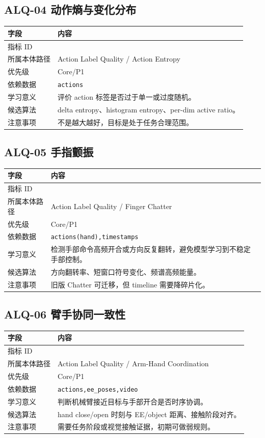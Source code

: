 \documentclass[UTF8,zihao=-4]{ctexart}
\newcommand{\Code}[1]{\texttt{#1}}
\newcommand{\MID}[1]{\texttt{\seqsplit{#1}}}
\begin{document}
\subsection{ALQ-04 动作熵与变化分布}

\begin{longtable}{L{3.6cm} L{9.6cm}}
\toprule
字段 & 内容 \\
\midrule
指标 ID & \MID{ALQ-04} \\
所属本体路径 & Action Label Quality / Action Entropy \\
优先级 & Core/P1 \\
依赖数据 & \Code{actions} \\
学习意义 & 评价 action 标签是否过于单一或过度随机。 \\
候选算法 & delta entropy、histogram entropy、per-dim active ratio。 \\
注意事项 & 不是越大越好，目标是处于任务合理范围。 \\
\bottomrule
\end{longtable}

\subsection{ALQ-05 手指颤振}

\begin{longtable}{L{3.6cm} L{9.6cm}}
\toprule
字段 & 内容 \\
\midrule
指标 ID & \MID{ALQ-05} \\
所属本体路径 & Action Label Quality / Finger Chatter \\
优先级 & Core/P1 \\
依赖数据 & \Code{actions(hand),timestamps} \\
学习意义 & 检测手部命令高频开合或方向反复翻转，避免模型学习到不稳定手部控制。 \\
候选算法 & 方向翻转率、短窗口符号变化、频谱高频能量。 \\
注意事项 & 旧版 Chatter 可迁移，但 timeline 需要降碎片化。 \\
\bottomrule
\end{longtable}

\subsection{ALQ-06 臂手协同一致性}

\begin{longtable}{L{3.6cm} L{9.6cm}}
\toprule
字段 & 内容 \\
\midrule
指标 ID & \MID{ALQ-06} \\
所属本体路径 & Action Label Quality / Arm-Hand Coordination \\
优先级 & Core/P1 \\
依赖数据 & \Code{actions,ee\_poses,video} \\
学习意义 & 判断机械臂接近目标与手部开合是否时序协调。 \\
候选算法 & hand close/open 时刻与 EE/object 距离、接触阶段对齐。 \\
注意事项 & 需要任务阶段或视觉接触证据，初期可做弱规则。 \\
\bottomrule
\end{longtable}
\end{document}
